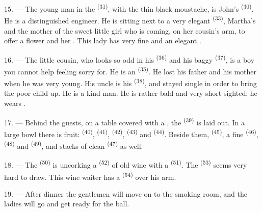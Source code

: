 15. --- The young man in the  \textsuperscript{(31)}, with the thin black
moustache, is John's  \textsuperscript{(30)}. He is a distinguished
engineer. He is sitting next to a very elegant
 \textsuperscript{(33)}, Martha's  and the
mother of the sweet little girl who is coming, on her cousin's arm, to offer a flower and
 her . This lady has very fine  and an
elegant .

16. --- The little cousin, who looks so odd in his  \textsuperscript{(36)} and
his baggy  \textsuperscript{(37)}, is a boy you cannot help feeling sorry
for. He is an  \textsuperscript{(35)}. He lost his father and his mother when
he was very young. His uncle is his  \textsuperscript{(38)}, and stayed
single in order to bring the poor child up. He is a kind man. He is rather bald and very
short-sighted; he wears
.

\VUsaut{2.4mm}
\VUsaut{3.0mm}

17. --- Behind the guests, on a table covered with a , the 
\textsuperscript{(39)} is laid out. In a large bowl there is fruit: 
\textsuperscript{(40)},  \textsuperscript{(41)},
 \textsuperscript{(42)},  \textsuperscript{(43)} and
 \textsuperscript{(44)}. Beside them, 
\textsuperscript{(45)}, a fine  \textsuperscript{(46)},
 \textsuperscript{(48)} and 
\textsuperscript{(49)}, and stacks of clean  \textsuperscript{(47)} as well.

18. --- The  \textsuperscript{(50)} is uncorking a 
\textsuperscript{(52)} of old wine with a  \textsuperscript{(51)}. The
 \textsuperscript{(53)} seems very hard to draw. This wine waiter has a
 \textsuperscript{(54)} over his arm.

19. --- After dinner the gentlemen will move on to the smoking room, and the ladies will go
and get ready for the ball.

\VUsaut{5.0mm}
\VUsaut{1.6mm}
\VUsaut{2.6mm}


